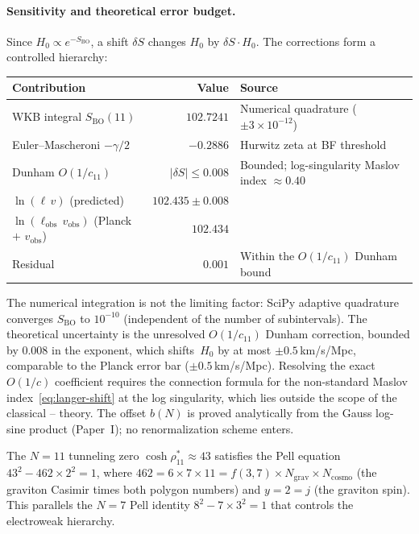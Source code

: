\paragraph{Sensitivity and theoretical error budget.}
Since $H_0 \propto e^{-S_{\mathrm{BO}}}$, a shift $\delta S$
changes $H_0$ by $\delta S \cdot H_0$.
The corrections form a controlled hierarchy:
\begin{center}
\small
\begin{tabular}{lrl}
\toprule
Contribution & Value & Source \\
\midrule
WKB integral $S_{\mathrm{BO}}(11)$ & $102.7241$ &
  Numerical quadrature ($\pm\!3 \times 10^{-12}$) \\
Euler--Mascheroni $-\gamma/2$ & $-0.2886$ &
  Hurwitz zeta at BF threshold \\
Dunham $O(1/c_{11})$ & $|\delta S| \le 0.008$ &
  Bounded; log-singularity Maslov index $\approx 0.40$ \\
\midrule
$\ln(\ell\,v)$ (predicted) & $102.435 \pm 0.008$ & \\
$\ln(\ell_{\mathrm{obs}}\,v_{\mathrm{obs}})$ (Planck $+$ $v_{\mathrm{obs}}$) & $102.434$ & \\
\midrule
Residual & $0.001$ &
  Within the $O(1/c_{11})$ Dunham bound \\
\bottomrule
\end{tabular}
\end{center}
The numerical integration is not the limiting factor:
SciPy adaptive quadrature converges $S_{\mathrm{BO}}$ to
$10^{-10}$ (independent of the number of subintervals).
The theoretical uncertainty is the unresolved $O(1/c_{11})$
Dunham correction, bounded by $0.008$ in the exponent, which
shifts~$H_0$ by at most $\pm 0.5$\,km/s/Mpc, comparable to
the Planck error bar ($\pm 0.5$\,km/s/Mpc).
Resolving the exact $O(1/c)$ coefficient requires the
connection formula for the non-standard Maslov
index~\eqref{eq:langer-shift} at the log singularity,
which lies outside the scope of the classical
\citeauthor{Langer1937}--\citeauthor{BerryMount1972} theory.
The offset $b(N)$ is proved analytically from the Gauss log-sine
product (Paper~I); no renormalization scheme enters.

\begin{remark}[The Pell connection at $N = 11$]
The $N = 11$ tunneling zero $\cosh\rho^*_{11} \approx 43$ satisfies
the Pell equation
$43^2 - 462 \times 2^2 = 1$,
where $462 = 6 \times 7 \times 11 = f(3,7) \times N_{\mathrm{grav}}
\times N_{\mathrm{cosmo}}$ (the graviton Casimir times both polygon
numbers) and $y = 2 = j$ (the graviton spin).
This parallels the $N = 7$ Pell identity
$8^2 - 7 \times 3^2 = 1$ that controls the electroweak hierarchy.
\end{remark}

